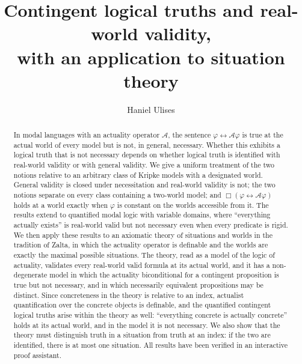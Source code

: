 \documentclass[11pt]{amsart}
\theoremstyle{plain}
\theoremstyle{definition}
\theoremstyle{remark}
\newcommand{\Act}{\mathcal{A}}
\begin{document}
\title[Contingent logical truths and real-world validity]{Contingent
logical truths and real-world validity,\\ with an application to
situation theory}

\author{Haniel Ulises}

\date{}



\begin{abstract}
In modal languages with an actuality operator $\Act$, the sentence
$\varphi \leftrightarrow \Act\varphi$ is true at the actual world of
every model but is not, in general, necessary. Whether this exhibits a
logical truth that is not necessary depends on whether logical truth is
identified with real-world validity or with general validity. We give a
uniform treatment of the two notions relative to an arbitrary class of
Kripke models with a designated world. General validity is closed under
necessitation and real-world validity is not; the two notions separate
on every class containing a two-world model; and
$\Box(\varphi \leftrightarrow \Act\varphi)$ holds at a world exactly
when $\varphi$ is constant on the worlds accessible from it. The
results extend to quantified modal logic with variable domains, where
``everything actually exists'' is real-world valid but not necessary
even when every predicate is rigid. We then
apply these results to an axiomatic theory of situations and worlds in
the tradition of Zalta, in which the actuality operator is definable
and the worlds are exactly the maximal possible situations. The theory,
read as a model of the logic of actuality, validates every real-world
valid formula at its actual world, and it has a non-degenerate model in
which the actuality biconditional for a contingent proposition is true
but not necessary, and in which necessarily equivalent propositions may
be distinct. Since concreteness in the theory is relative to an index,
actualist quantification over the concrete objects is definable, and
the quantified contingent logical truths arise within the theory as
well: ``everything concrete is actually concrete'' holds at its actual
world, and in the model it is not necessary. We also show that the theory must distinguish truth
in a situation from truth at an index: if the two are identified, there
is at most one situation. All results have been verified in an
interactive proof assistant.
\end{abstract}
\end{document}
